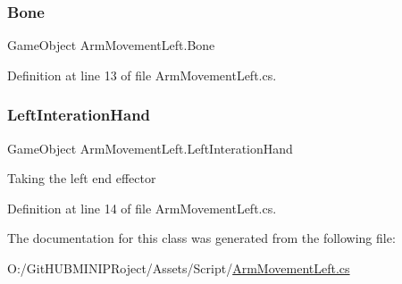 \subsubsection{\texorpdfstring{Bone}{Bone}}
{\footnotesize\ttfamily Game\+Object Arm\+Movement\+Left.\+Bone}



Definition at line 13 of file Arm\+Movement\+Left.\+cs.

\mbox{\label{class_arm_movement_left_a4e4cae8b4605f31c2a8a74b7bcb14ce3}} 
\subsubsection{\texorpdfstring{LeftInterationHand}{LeftInterationHand}}
{\footnotesize\ttfamily Game\+Object Arm\+Movement\+Left.\+Left\+Interation\+Hand}

Taking the left end effector 

Definition at line 14 of file Arm\+Movement\+Left.\+cs.



The documentation for this class was generated from the following file\+:\begin{DoxyCompactItemize}
\item 
O\+:/\+Git\+H\+U\+B\+M\+I\+N\+I\+P\+Roject/\+Assets/\+Script/\mbox{\hyperlink{_arm_movement_left_8cs}{Arm\+Movement\+Left.\+cs}}\end{DoxyCompactItemize}
